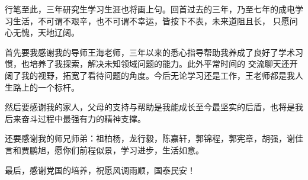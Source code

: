 \thesisacknowledgement

行笔至此，三年研究生学习生涯也将画上句。回首过去的三年，乃至七年的成电学习生活，不可谓不艰辛，也不可谓不幸运，皆按下不表，未来道阻且长，
只愿问心无愧，天地辽阔。

首先要我感谢我的导师王海老师，三年以来的悉心指导帮助我养成了良好了学术习惯，也培养了我探索，解决未知领域问题的能力。此外平常时间的
交流聊天还开阔了我的视野，拓宽了看待问题的角度。今后无论学习还是工作，王老师都是我人生路上的一个标杆。

然后要感谢我的家人，父母的支持与帮助是我能成长至今最坚实的后盾，也将是我后来奋斗过程中最强有力的精神支撑。

还要感谢我的师兄师弟：祖柏杨，龙行毅，陈嘉轩，郭锦程，郭宪章，胡强，谢佳言和贾鹏旭，愿你们前程似景，学习进步，生活如意。

最后，感谢党国的培养，祝愿风调雨顺，国泰民安！
